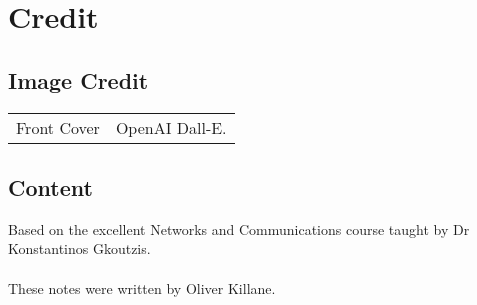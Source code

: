 \chapter{Credit}
\section*{Image Credit}
\begin{center}
    \begin{tabular}{r p{}}
        Front Cover & OpenAI Dall-E. \\
    \end{tabular}
\end{center}

\section*{Content}
Based on the excellent Networks and Communications course taught by Dr Konstantinos Gkoutzis.
\\
\\ These notes were written by Oliver Killane.
